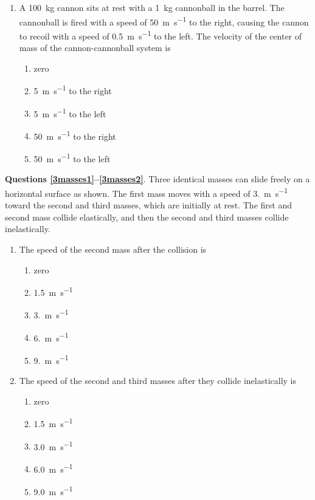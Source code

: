 \documentclass{../../../oss-apphys}
\begin{document}
\begin{multicols}{2}
\begin{enumerate}[leftmargin=18pt,resume]
  \item A \SI{100}{\kilo\gram} cannon sits at rest with a \SI{1}{\kilo\gram}
    cannonball in the barrel. The cannonball is fired with a speed of
    \SI{50}{\metre\per\second} to the right, causing the cannon to recoil with
    a speed of \SI{.5}{\metre\per\second} to the left. The velocity of the
    center of mass of the cannon-cannonball system is
    \begin{enumerate}[noitemsep,topsep=0pt,leftmargin=18pt,label=(\Alph*)]
    \item zero
    \item\SI{5}{\metre\per\second} to the right
    \item\SI{5}{\metre\per\second} to the left
    \item\SI{50}{\metre\per\second} to the right
    \item\SI{50}{\metre\per\second} to the left
    \end{enumerate}
  \end{enumerate}
  \columnbreak
  
  \textbf{Questions \ref{3masses1}--\ref{3masses2}}. Three identical masses can
  slide freely on a horizontal surface as shown. The first mass moves with a
  speed of \SI{3.}{\metre\per\second} toward the second and third masses, which
  are initially at rest. The first and second mass collide elastically, and
  then the second and third masses collide inelastically.
  \begin{center}
  \end{center}
  \begin{enumerate}[leftmargin=18pt,resume]
  \item The speed of the second mass after the collision is
    \label{3masses1}
    \begin{enumerate}[noitemsep,topsep=0pt,leftmargin=18pt,label=(\Alph*)]
    \item zero
    \item\SI{1.5}{\metre\per\second}
    \item\SI{3.}{\metre\per\second}
    \item\SI{6.}{\metre\per\second}
    \item\SI{9.}{\metre\per\second}
    \end{enumerate}

  \item The speed of the second and third masses after they collide
    inelastically is
    \label{3masses2}
    \begin{enumerate}[noitemsep,topsep=0pt,leftmargin=18pt,label=(\Alph*)]
    \item zero
    \item\SI{1.5}{\metre\per\second}
    \item\SI{3.0}{\metre\per\second}
    \item\SI{6.0}{\metre\per\second}
    \item\SI{9.0}{\metre\per\second}
    \end{enumerate}
  \end{enumerate}
  

\end{multicols}
\end{document}
